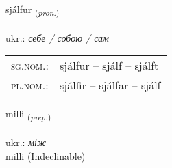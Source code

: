 \documentclass[frontgrid, backgrid]{flacards}\usepackage[]{graphicx}\usepackage[]{xcolor}
\begin{document}
\renewcommand{\blhead}{\vskip5pt {\small\bfseries\footnotesize Fornafn | займенник }}
\renewcommand{\bcfoot}{\vskip5pt \hspace{2pt}{\small\bfseries\footnotesize 1K}}


{sjálfur \small{\textsubscript{(\textit{pron.})}} \\[1ex] %
\textphonetic{[sjaulvʏr]} \\
ukr.: \emph{себе / собою / сам} \\  [2ex]
\renewcommand*{\arraystretch}{0.8}
\begin{tabular}{ll}
\textsc{sg.nom.}: & sjálfur  --  sjálf -- sjálft \\ 
\textsc{pl.nom.}: & sjálfir -- sjálfar -- sjálf
\end{tabular}
}


\renewcommand{\flhead}{\vskip5pt \fboxsep=0pt {\small\bfseries\footnotesize Forsetning | прийменник}}
\renewcommand{\fcfoot}{\vskip5pt \fboxsep=0pt \hspace{2pt}{\small\bfseries\footnotesize 1K}}

\renewcommand{\blhead}{\vskip5pt {\small\bfseries\footnotesize Forsetning | прийменник }}
\renewcommand{\bcfoot}{\vskip5pt \hspace{2pt}{\small\bfseries\footnotesize 1K}}


{milli \small{\textsubscript{(\textit{prep.})}} \\[1ex]
\textphonetic{[mɪtlɪ]} \\
ukr.: \emph{між} \\  [2ex]
milli (Indeclinable)}


\renewcommand{\flhead}{\vskip5pt \fboxsep=0pt {\small\bfseries\footnotesize Forsetning | прийменник}}
\renewcommand{\fcfoot}{\vskip5pt \fboxsep=0pt \hspace{2pt}{\small\bfseries\footnotesize 1K}}

\renewcommand{\blhead}{\vskip5pt {\small\bfseries\footnotesize Forsetning | прийменник }}
\renewcommand{\bcfoot}{\vskip5pt \hspace{2pt}{\small\bfseries\footnotesize 1K}}
\end{document}
